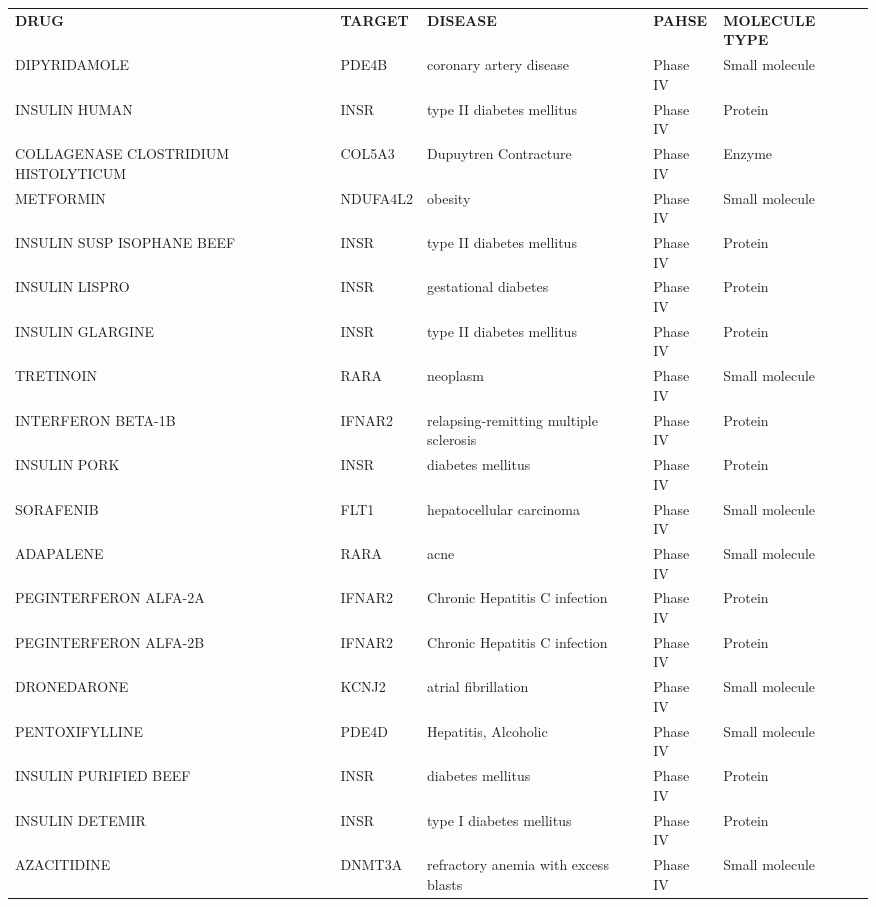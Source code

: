 \documentclass[fleqn,10pt]{SelfArx} %
\begin{document}
\begin{table}[ht]
	\centering
	\scriptsize
	\begin{tabularx}{\textwidth}{lXlll}
		\rowcolor{NavyBlue!80}
		 \textbf{\color{white} DRUG} & \textbf{\color{white} TARGET} & \textbf{\color{white} DISEASE} & \textbf{\color{white} PAHSE} & \textbf{\color{white} MOLECULE TYPE} \\
		DIPYRIDAMOLE & PDE4B & coronary artery disease & Phase IV & Small molecule \\ 
		INSULIN HUMAN & INSR & type II diabetes mellitus & Phase IV & Protein \\ 
		COLLAGENASE CLOSTRIDIUM HISTOLYTICUM & COL5A3 & Dupuytren Contracture & Phase IV & Enzyme \\ 
		METFORMIN & NDUFA4L2 & obesity & Phase IV & Small molecule \\ 
		INSULIN SUSP ISOPHANE BEEF & INSR & type II diabetes mellitus & Phase IV & Protein \\ 
		INSULIN LISPRO & INSR & gestational diabetes & Phase IV & Protein \\ 
		INSULIN GLARGINE & INSR & type II diabetes mellitus & Phase IV & Protein \\ 
		TRETINOIN & RARA & neoplasm & Phase IV & Small molecule \\ 
		INTERFERON BETA-1B & IFNAR2 & relapsing-remitting multiple sclerosis & Phase IV & Protein \\ 
		INSULIN PORK & INSR & diabetes mellitus & Phase IV & Protein \\ 
		SORAFENIB & FLT1 & hepatocellular carcinoma & Phase IV & Small molecule \\ 
		ADAPALENE & RARA & acne & Phase IV & Small molecule \\ 
		PEGINTERFERON ALFA-2A & IFNAR2 & Chronic Hepatitis C infection & Phase IV & Protein \\ 
		PEGINTERFERON ALFA-2B & IFNAR2 & Chronic Hepatitis C infection & Phase IV & Protein \\ 
		DRONEDARONE & KCNJ2 & atrial fibrillation & Phase IV & Small molecule \\ 
		PENTOXIFYLLINE & PDE4D & Hepatitis, Alcoholic & Phase IV & Small molecule \\ 
		INSULIN PURIFIED BEEF & INSR & diabetes mellitus & Phase IV & Protein \\ 
		INSULIN DETEMIR & INSR & type I diabetes mellitus & Phase IV & Protein \\ 
		AZACITIDINE & DNMT3A & refractory anemia with excess blasts & Phase IV & Small molecule \\ 

\end{tabularx}
\end{table}
\end{document}
